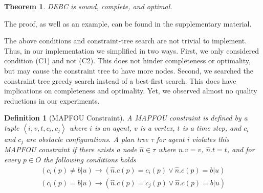 \documentclass[letterpaper]{article} %
\newcommand{\unknown}{\textit{b}|\textit{u}}
\newcommand{\tuple}[1]{\ensuremath{\left \langle #1 \right \rangle }}
\newcommand{\commentout}[1]{}
\newtheorem{theorem}{Theorem}
\newtheorem{definition}{Definition}
\begin{document}
{\begin{theorem}
DEBC is sound, complete, and optimal.
\label{the:debc-optimal}
\end{theorem}
The proof, as well as an example, can be found in the supplementary material.
\commentout{
\begin{proof}
Soundness is guaranteed because only solutions without conflicts are returned.
To prove completeness and optimality in the same way given for the standard CBS-based algorithms~\cite{sharon2015conflict,atzmon2020robust,li2020new}, we must prove that the pair of constraints we impost when a conflict is detected is \emph{sound}~\cite{atzmon2020robust,li2020new}.
That is, the constraints we impose do not preclude reaching any (conflict-free) solution.
To see this, consider a conflict formed by a pair of plan tree nodes
$n^i$ and $n^j$ at vertex $v$ and time $t$ with obstacle configurations $c_i$ and $c_j$, respectively.
The corresponding MAPFOU constraints are $\tuple{i,v,t,c_i,c_j}$
and $\tuple{j,v,t,c_j,c_j}$.
We will now show that any solution to the given MAPFOU solution must satisfy at least one of these constraints.
We prove this by negation: let $\{\hat{\tau}^i\}$ be a (conflict-free) solution that does not satisfy both constraints.
This means the plan trees $\hat{\tau}^i$ and $\hat{\tau}^j$
include nodes
$\hat{n}^j$ and
$\hat{n}^i$, respectively,
where $\hat{n}^i.v=v$, $\hat{n}^i.t=t$,
and $\hat{n}^i.c$ and $\hat{n}^j.c$
satisfy either (C1) or (C2) from Definition~\ref{def:mapfou-constraint}
for their respective constraints.
Thus, either both nodes satisfy (C1), both satisfy (C2), or one satisfies (C1) and the other (C2).
For each of these cases, $\hat{n}^i.c$ and $\hat{n}^j.c$ ends up being consistent, which means that $\hat{n}^i$ and $\hat{n}^j$ form a conflict, contradicting the assumption that $\{\hat{\tau}^i\}$ is a (conflict-free) solution.
\end{proof}
}
The above conditions and constraint-tree search are not trivial to implement. Thus, in our implementation we simplified in two ways.
First, we only considered condition (C1) and not (C2). This does not hinder completeness or optimality, but may cause the constraint tree to have more nodes.
Second, we searched the constraint tree greedy search instead of a best-first search. This does have implications on completeness and optimality. Yet, we observed almost no quality reductions in our experiments.
}
\begin{definition}[MAPFOU Constraint]
A MAPFOU constraint is defined by a tuple $\tuple{i,v,t,c_i,c_j}$
where $i$ is an agent,
$v$ is a vertex,
$t$ is a time step,
and $c_i$ and $c_j$ are obstacle configurations.
A plan tree $\tau$ for agent $i$ violates this MAPFOU constraint if there exists a node $\hat{n}\in\tau$ where $\hat{n}.v=v$,  $\hat{n}.t=t$, and for every $p\in O$ the following conditions holds
\begin{eqnarray}
\left(c_i(p)\neq\unknown\right)\rightarrow \left(\hat{n}.c(p)=c_i(p)\vee \hat{n}.c(p)=\unknown\right) \label{eq:root-to-node}
\\
\left(c_i(p)=\unknown\right)\rightarrow \left(\hat{n}.c(p)=c_j(p)\vee \hat{n}.c(p)=\unknown\right)  \label{eq:node-to-leaf}
\end{eqnarray}
\label{def:mapfou-constraint}
\end{definition}
\end{document}
